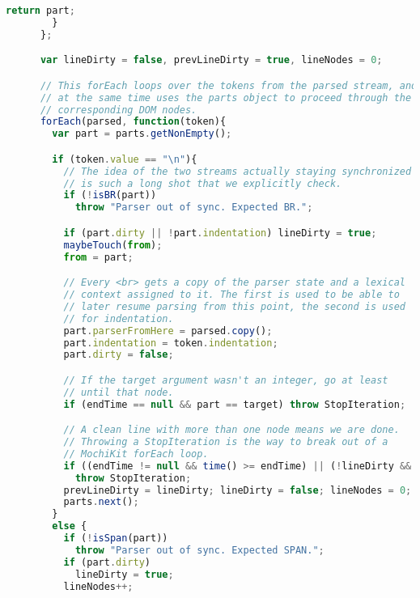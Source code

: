 \begin{lstlisting}[language=Javascript]
          return part;
        }
      };

      var lineDirty = false, prevLineDirty = true, lineNodes = 0;

      // This forEach loops over the tokens from the parsed stream, and
      // at the same time uses the parts object to proceed through the
      // corresponding DOM nodes.
      forEach(parsed, function(token){
        var part = parts.getNonEmpty();

        if (token.value == "\n"){
          // The idea of the two streams actually staying synchronized
          // is such a long shot that we explicitly check.
          if (!isBR(part))
            throw "Parser out of sync. Expected BR.";

          if (part.dirty || !part.indentation) lineDirty = true;
          maybeTouch(from);
          from = part;

          // Every <br> gets a copy of the parser state and a lexical
          // context assigned to it. The first is used to be able to
          // later resume parsing from this point, the second is used
          // for indentation.
          part.parserFromHere = parsed.copy();
          part.indentation = token.indentation;
          part.dirty = false;

          // If the target argument wasn't an integer, go at least
          // until that node.
          if (endTime == null && part == target) throw StopIteration;

          // A clean line with more than one node means we are done.
          // Throwing a StopIteration is the way to break out of a
          // MochiKit forEach loop.
          if ((endTime != null && time() >= endTime) || (!lineDirty && !prevLineDirty && lineNodes > 1 && !cleanLines))
            throw StopIteration;
          prevLineDirty = lineDirty; lineDirty = false; lineNodes = 0;
          parts.next();
        }
        else {
          if (!isSpan(part))
            throw "Parser out of sync. Expected SPAN.";
          if (part.dirty)
            lineDirty = true;
          lineNodes++;


\end{lstlisting}

